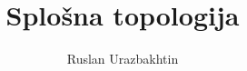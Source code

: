 \documentclass[11pt, a4paper]{article}
\begin{document}
\title{Splošna topologija}
\author{Ruslan Urazbakhtin}
\maketitle

\newpage
\tableofcontents
\newpage



\newpage


\newpage


\newpage

\end{document}
